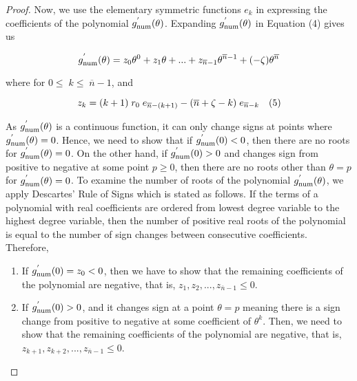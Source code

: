 \documentclass[letterpaper]{article} %
\theoremstyle{definition}
\begin{document}
\begin{proof}
\noindent Now, we use the elementary symmetric functions $e_{k}$ in expressing the coefficients of the polynomial $g^{'}_{\textnormal{num}}(\theta)$. Expanding $g^{'}_{\textnormal{num}}(\theta)$ in Equation (4) gives us
\begin{linenomath}
\begin{equation*}
g^{'}_{\textnormal{num}}(\theta) = z_{0} \theta^{0} + z_{1} \theta + ... + z_{\overline{n}-1} \theta^{\overline{n}-1} + (-\zeta) \theta^{\overline{n}}    
\end{equation*}
\end{linenomath}

\noindent where for $0 \leq \; k \leq \; \overline{n} -1$, and
\begin{linenomath}
\begin{equation*}
z_{k} = (k+1)\; r_{0} \; e_{\overline{n}-(k+1)}  - (\overline{n} + \zeta -k) \; e_{\overline{n}-k} \quad \textnormal{(5)}    
\end{equation*}
\end{linenomath}

\noindent As $g^{'}_{\textnormal{num}}(\theta)$ is a continuous function, it can only change signs at points where $g^{'}_{\textnormal{num}}(\theta) = 0$. Hence, we need to show that if $g^{'}_{\textnormal{num}}(0) < 0$, then there are no roots for $g^{'}_{\textnormal{num}}(\theta) = 0$. On the other hand, if  $g^{'}_{\textnormal{num}}(0) > 0$ and changes sign from positive to negative at some point $p \geq 0$, then there are no roots other than $\theta = p$ for $g^{'}_{\textnormal{num}}(\theta) = 0$. To examine the number of roots of the polynomial $g^{'}_{\textnormal{num}}(\theta)$, we apply Descartes' Rule of Signs which is stated as follows. If the terms of a polynomial with real coefficients are ordered from lowest degree variable to the highest degree variable, then the number of positive real roots of the polynomial is equal to the number of sign changes between consecutive coefficients. Therefore, 
\begin{enumerate}
    \item If $g^{'}_{\textnormal{num}}(0) = z_{0} < 0$, then we have to show that the remaining coefficients of the polynomial are negative, that is, $z_{1}, z_{2}, ..., z_{\overline{n}-1} \leq 0$.  
    
    \item If $g^{'}_{\textnormal{num}}(0) > 0$, and it changes sign at a point $\theta = p$ meaning there is a sign change from positive to negative at some coefficient of $\theta^{k}$. Then, we need to show that the remaining coefficients of the polynomial are negative, that is,  \\$z_{k+1}, z_{k+2}, ..., z_{\overline{n}-1} \leq 0$. 
\end{enumerate}


\end{proof}
\end{document}

